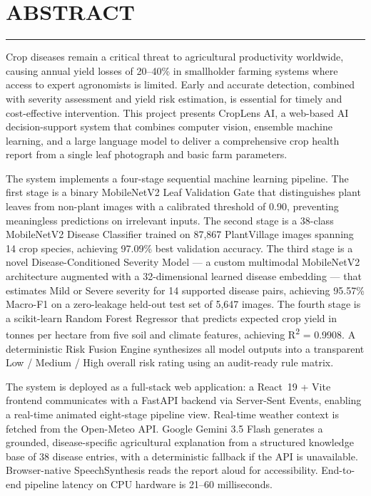 \chapter*{ABSTRACT}
\noindent\rule{\linewidth}{2pt}

\vspace{30pt}

\noindent
Crop diseases remain a critical threat to agricultural productivity worldwide, causing annual yield losses of 20--40\% in smallholder farming systems where access to expert agronomists is limited. Early and accurate detection, combined with severity assessment and yield risk estimation, is essential for timely and cost-effective intervention. This project presents CropLens AI, a web-based AI decision-support system that combines computer vision, ensemble machine learning, and a large language model to deliver a comprehensive crop health report from a single leaf photograph and basic farm parameters.

\par
The system implements a four-stage sequential machine learning pipeline. The first stage is a binary MobileNetV2 Leaf Validation Gate that distinguishes plant leaves from non-plant images with a calibrated threshold of 0.90, preventing meaningless predictions on irrelevant inputs. The second stage is a 38-class MobileNetV2 Disease Classifier trained on 87,867 PlantVillage images spanning 14 crop species, achieving 97.09\% best validation accuracy. The third stage is a novel Disease-Conditioned Severity Model --- a custom multimodal MobileNetV2 architecture augmented with a 32-dimensional learned disease embedding --- that estimates Mild or Severe severity for 14 supported disease pairs, achieving 95.57\% Macro-F1 on a zero-leakage held-out test set of 5,647 images. The fourth stage is a scikit-learn Random Forest Regressor that predicts expected crop yield in tonnes per hectare from five soil and climate features, achieving R\textsuperscript{2} = 0.9908. A deterministic Risk Fusion Engine synthesizes all model outputs into a transparent Low / Medium / High overall risk rating using an audit-ready rule matrix.

\par
The system is deployed as a full-stack web application: a React~19 + Vite frontend communicates with a FastAPI backend via Server-Sent Events, enabling a real-time animated eight-stage pipeline view. Real-time weather context is fetched from the Open-Meteo API. Google Gemini 3.5 Flash generates a grounded, disease-specific agricultural explanation from a structured knowledge base of 38 disease entries, with a deterministic fallback if the API is unavailable. Browser-native SpeechSynthesis reads the report aloud for accessibility. End-to-end pipeline latency on CPU hardware is 21--60 milliseconds.

